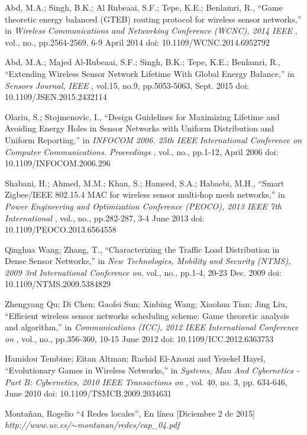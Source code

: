 \documentclass[journal]{IEEEtran}
\begin{document}
\begin{thebibliography}{15}

 Abd, M.A.; Singh, B.K.; Al Rubeaai, S.F.; Tepe, K.E.; Benlamri, R., ``Game theoretic energy balanced (GTEB) routing protocol for wireless sensor networks,'' in \textit{Wireless Communications and Networking Conference (WCNC), 2014 IEEE }, vol., no., pp.2564-2569, 6-9 April 2014 doi: 10.1109/WCNC.2014.6952792

 Abd, M.A.; Majed Al-Rubeaai, S.F.; Singh, B.K.; Tepe, K.E.; Benlamri, R., ``Extending Wireless Sensor Network Lifetime With Global Energy Balance,'' in \textit{Sensors Journal, IEEE }, vol.15, no.9, pp.5053-5063, Sept. 2015 doi: 10.1109/JSEN.2015.2432114

 Olariu, S.; Stojmenovic, I., ``Design Guidelines for Maximizing Lifetime and Avoiding Energy Holes in Sensor Networks with Uniform Distribution and Uniform Reporting,'' in \textit{INFOCOM 2006. 25th IEEE International Conference on Computer Communications. Proceedings }, vol., no., pp.1-12, April 2006 doi: 10.1109/INFOCOM.2006.296

 Shabani, H.; Ahmed, M.M.; Khan, S.; Hameed, S.A.; Habaebi, M.H., ``Smart Zigbee/IEEE 802.15.4 MAC for wireless sensor multi-hop mesh networks,'' in \textit{Power Engineering and Optimization Conference (PEOCO), 2013 IEEE 7th International} , vol., no., pp.282-287, 3-4 June 2013 doi: 10.1109/PEOCO.2013.6564558

 Qinghua Wang; Zhang, T., ``Characterizing the Traffic Load Distribution in Dense Sensor Networks,'' in \textit{New Technologies, Mobility and Security (NTMS), 2009 3rd International Conference on}, vol., no., pp.1-4, 20-23 Dec. 2009 doi: 10.1109/NTMS.2009.5384829

 Zhengyang Qu; Di Chen; Gaofei Sun; Xinbing Wang; Xiaohua Tian; Jing Liu, ``Efficient wireless sensor networks scheduling scheme: Game theoretic analysis and algorithm,'' in \textit{Communications (ICC), 2012 IEEE International Conference on }, vol., no., pp.356-360, 10-15 June 2012 doi: 10.1109/ICC.2012.6363753

 Hamidou Tembine; Eitan Altman; Rachid El-Azouzi and Yezekel Hayel, ``Evolutionary Games in Wireless Networks,'' in \textit{Systems, Man And Cybernetics - Part B: Cybernetics, 2010 IEEE Transactions on }, vol. 40, no. 3, pp. 634-646, June 2010 doi: 10.1109/TSMCB.2009.2034631

 Montañan, Rogelio ``4 Redes locales'', En línea [Diciembre 2 de 2015] \textit{http://www.uv.es/$\sim$montanan/redes/cap\_04.pdf}


\end{thebibliography}
\end{document}
